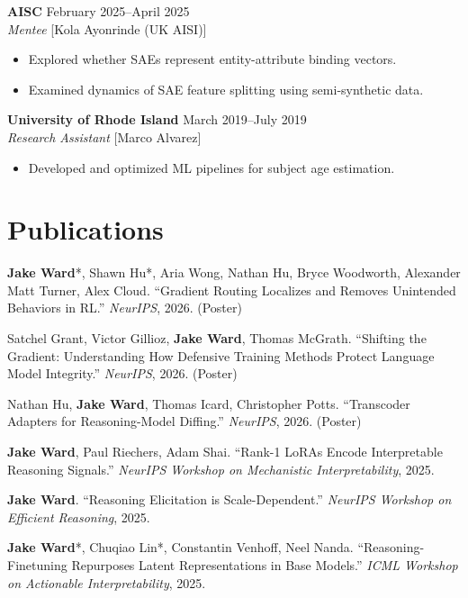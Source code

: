 \documentclass[11pt,a4paper]{article}
\begin{document}
\textbf{AISC} \hfill February 2025--April 2025 \\
\textit{Mentee} [Kola Ayonrinde (UK AISI)]
\begin{itemize}[noitemsep,topsep=2pt,leftmargin=15pt,label=\textendash]
    \item Explored whether SAEs represent entity-attribute binding vectors.
    \item Examined dynamics of SAE feature splitting using semi-synthetic data.
\end{itemize}
\vspace{5pt}

\textbf{University of Rhode Island} \hfill March 2019--July 2019 \\
\textit{Research Assistant} [Marco Alvarez]
\begin{itemize}[noitemsep,topsep=2pt,leftmargin=15pt,label=\textendash]
    \item Developed and optimized ML pipelines for subject age estimation.
\end{itemize}

\section{Publications}
\begin{enumerate}[label={[\arabic*]},leftmargin=22pt,itemsep=3pt,topsep=0pt,parsep=0pt]
    \item\label{pub:gr} \textbf{Jake Ward}*, Shawn Hu*, Aria Wong, Nathan Hu, Bryce Woodworth, Alexander Matt Turner, Alex Cloud. ``Gradient Routing Localizes and Removes Unintended Behaviors in RL.'' \textit{NeurIPS}, 2026. (Poster)
    \item Satchel Grant, Victor Gillioz, \textbf{Jake Ward}, Thomas McGrath. ``Shifting the Gradient: Understanding How Defensive Training Methods Protect Language Model Integrity.'' \textit{NeurIPS}, 2026. (Poster)
    \item Nathan Hu, \textbf{Jake Ward}, Thomas Icard, Christopher Potts. ``Transcoder Adapters for Reasoning-Model Diffing.'' \textit{NeurIPS}, 2026. (Poster)
    \item\label{pub:rank1} \textbf{Jake Ward}, Paul Riechers, Adam Shai. ``Rank-1 LoRAs Encode Interpretable Reasoning Signals.'' \textit{NeurIPS Workshop on Mechanistic Interpretability}, 2025.
    \item \textbf{Jake Ward}. ``Reasoning Elicitation is Scale-Dependent.'' \textit{NeurIPS Workshop on Efficient Reasoning}, 2025.
    \item \textbf{Jake Ward}*, Chuqiao Lin*, Constantin Venhoff, Neel Nanda. ``Reasoning-Finetuning Repurposes Latent Representations in Base Models.'' \textit{ICML Workshop on Actionable Interpretability}, 2025.
\end{enumerate}
\end{document}
